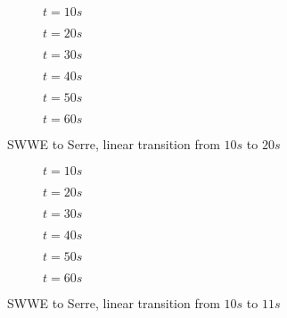 \documentclass[10pt]{article}
\begin{document}
\begin{figure}
	\centering
	\begin{subfigure}{0.49\textwidth}
	\centering
	
	\caption{$t=10s$}
	\end{subfigure}
	\begin{subfigure}{0.49\textwidth}
	\centering
	
	\caption{$t=20s$}
	\end{subfigure}
	\begin{subfigure}{0.49\textwidth}
	\centering
	
	\caption{$t=30s$}
	\end{subfigure}
	\begin{subfigure}{0.49\textwidth}
	\centering
	
	\caption{$t=40s$}
	\end{subfigure}
	\begin{subfigure}{0.49\textwidth}
	\centering
	
	\caption{$t=50s$}
	\end{subfigure}
	\begin{subfigure}{0.49\textwidth}
	\centering
	
	\caption{$t=60s$}
	\end{subfigure}
	\caption{ SWWE to Serre, linear transition from $10s$ to $20s$}
\end{figure}

\begin{figure}
	\centering
	\begin{subfigure}{0.49\textwidth}
		\centering
		
		\caption{$t=10s$}
	\end{subfigure}
	\begin{subfigure}{0.49\textwidth}
		\centering
		
		\caption{$t=20s$}
	\end{subfigure}
	\begin{subfigure}{0.49\textwidth}
		\centering
		
		\caption{$t=30s$}
	\end{subfigure}
	\begin{subfigure}{0.49\textwidth}
		\centering
		
		\caption{$t=40s$}
	\end{subfigure}
	\begin{subfigure}{0.49\textwidth}
		\centering
		
		\caption{$t=50s$}
	\end{subfigure}
	\begin{subfigure}{0.49\textwidth}
		\centering
		
		\caption{$t=60s$}
	\end{subfigure}
\caption{ SWWE to Serre, linear transition from $10s$ to $11s$}
\end{figure}
\end{document}
